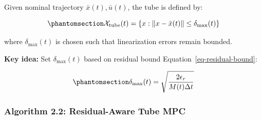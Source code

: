 \documentclass[
  letterpaper,
  DIV=11,
  numbers=noendperiod]{scrartcl}
\begin{document}
Given nominal trajectory \(\bar{x}(t), \bar{u}(t)\), the tube is defined
by:

\begin{equation}\phantomsection\label{eq-tube-def}{
\mathcal{X}_{\text{tube}}(t) = \{ x : \|x - \bar{x}(t)\| \leq \delta_{\max}(t) \}
}\end{equation}

where \(\delta_{\max}(t)\) is chosen such that linearization errors
remain bounded.

\textbf{Key idea:} Set \(\delta_{\max}(t)\) based on residual bound
Equation~\ref{eq-residual-bound}:

\begin{equation}\phantomsection\label{eq-tube-size}{
\delta_{\max}(t) = \sqrt{\frac{2 \epsilon_r}{M(t) \Delta t}}
}\end{equation}

\subsubsection{Algorithm 2.2: Residual-Aware Tube
MPC}\label{algorithm-2.2-residual-aware-tube-mpc}
\end{document}
